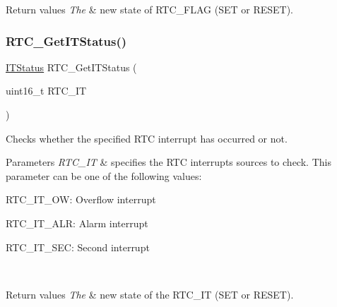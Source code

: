 \begin{DoxyRetVals}{Return values}
{\em The} & new state of R\+T\+C\+\_\+\+F\+L\+AG (S\+ET or R\+E\+S\+ET). \\
\hline
\end{DoxyRetVals}
\mbox{\label{group___r_t_c___exported___functions_ga23274ad8aa28e86d5b0d58eee295db21}} 
\subsubsection{\texorpdfstring{RTC\_GetITStatus()}{RTC\_GetITStatus()}}
{\footnotesize\ttfamily \mbox{\hyperlink{group___exported__types_gaacbd7ed539db0aacd973a0f6eca34074}{I\+T\+Status}} R\+T\+C\+\_\+\+Get\+I\+T\+Status (\begin{DoxyParamCaption}\item[{uint16\+\_\+t}]{R\+T\+C\+\_\+\+IT }\end{DoxyParamCaption})}



Checks whether the specified R\+TC interrupt has occurred or not. 


\begin{DoxyParams}{Parameters}
{\em R\+T\+C\+\_\+\+IT} & specifies the R\+TC interrupts sources to check. This parameter can be one of the following values\+: \begin{DoxyItemize}
\item R\+T\+C\+\_\+\+I\+T\+\_\+\+OW\+: Overflow interrupt \item R\+T\+C\+\_\+\+I\+T\+\_\+\+A\+LR\+: Alarm interrupt \item R\+T\+C\+\_\+\+I\+T\+\_\+\+S\+EC\+: Second interrupt \end{DoxyItemize}
\\
\hline
\end{DoxyParams}

\begin{DoxyRetVals}{Return values}
{\em The} & new state of the R\+T\+C\+\_\+\+IT (S\+ET or R\+E\+S\+ET). \\
\hline
\end{DoxyRetVals}
\mbox{\label{group___r_t_c___exported___functions_ga175dfe88866234730c1ec40d2221c4f4}} 
